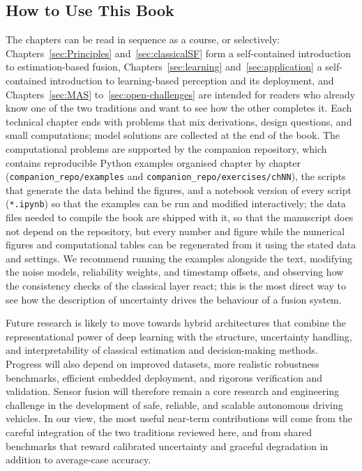\documentclass[graybox,envcountchap]{style/SNmono}
\newcommand{\repopath}[1]{\texttt{#1}}
\providecommand{\DIFadd}[1]{{\protect\color{blue} #1}} %
\providecommand{\DIFdel}[1]{{\protect\color{red} #1}} %
\providecommand{\DIFaddbegin}{} %
\providecommand{\DIFaddend}{} %
\providecommand{\DIFdelbegin}{} %
\providecommand{\DIFdelend}{} %
\begin{document}
\subsection*{How to Use This Book}

The chapters can be read in sequence as a course, or selectively: Chapters~\ref{sec:Principles} and~\ref{sec:classicalSF} form a self-contained introduction to estimation-based fusion, Chapters~\ref{sec:learning} and~\ref{sec:application} a self-contained introduction to learning-based perception and its deployment, and Chapters~\ref{sec:MAS} to~\ref{sec:open-challenges} are intended for readers who already know one of the two traditions and want to see how the other completes it. Each technical chapter ends with problems that mix derivations, design questions, and small computations; model solutions are collected at the end of the book. The computational problems are supported by the companion repository, which contains reproducible Python examples organised chapter by chapter (\repopath{companion\_\allowbreak repo/\allowbreak examples} and \repopath{companion\_\allowbreak repo/\allowbreak exercises/\allowbreak chNN}), the scripts that generate the data behind the figures, and a notebook version of every script (\repopath{*.ipynb}) so that the examples can be run and modified interactively; the data files needed to compile the book are shipped with it, so that the manuscript does not depend on the repository, \DIFdelbegin \DIFdel{but every number and figure }\DIFdelend \DIFaddbegin \DIFadd{while the numerical figures and computational tables }\DIFaddend can be regenerated \DIFdelbegin \DIFdel{from it}\DIFdelend \DIFaddbegin \DIFadd{using the stated data and settings}\DIFaddend . We recommend running the examples alongside the text, modifying the noise models, reliability weights, and timestamp offsets, and observing how the consistency checks of the classical layer react; this is the most direct way to see how the description of uncertainty drives the behaviour of a fusion system.

Future research is likely to move towards hybrid architectures that combine the representational power of deep learning with the structure, uncertainty handling, and interpretability of classical estimation and decision-making methods. Progress will also depend on improved datasets, more realistic robustness benchmarks, efficient embedded deployment, and rigorous verification and validation. Sensor fusion will therefore remain a core research and engineering challenge in the development of safe, reliable, and scalable autonomous driving vehicles. 
In our view, the most useful near-term contributions will come from the careful integration of the two traditions reviewed here, and from shared benchmarks that reward calibrated uncertainty and graceful degradation in addition to average-case accuracy.
\end{document}
